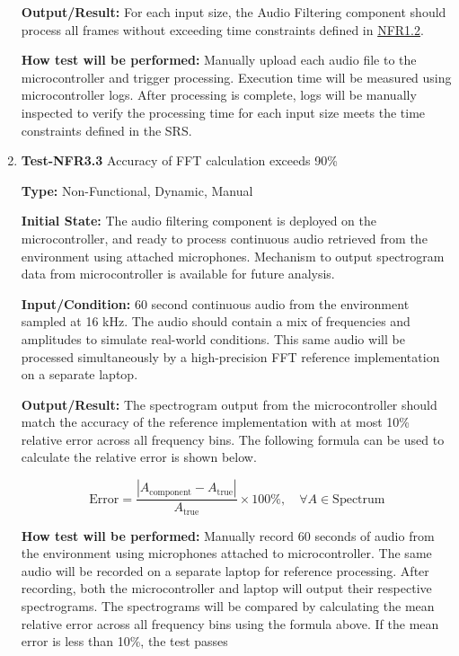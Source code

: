 \documentclass[12pt, titlepage]{article}
\begin{document}
\begin{enumerate}
\textbf{Output/Result:} 
For each input size, the Audio Filtering component should process all frames
without exceeding time constraints defined in \hyperref[SRS-NFR1_2]{NFR1.2}. 
					
\textbf{How test will be performed:} 
Manually upload each audio file to the microcontroller and trigger processing.
Execution time will be measured using microcontroller logs. After processing is
complete, logs will be manually inspected to verify the processing time for each
input size meets the time constraints defined in the SRS.

\item{\textbf{Test-NFR3.3} Accuracy of FFT calculation exceeds 90\%\\}

\textbf{Type:} Non-Functional, Dynamic, Manual
					
\textbf{Initial State:} 
The audio filtering component is deployed on the microcontroller, and ready to
process continuous audio retrieved from the environment using attached
microphones. Mechanism to output spectrogram data from microcontroller is
available for future analysis.
					
\textbf{Input/Condition:} 
60 second continuous audio from the environment sampled at 16 kHz. The audio
should contain a mix of frequencies and amplitudes to simulate real-world
conditions. This same audio will be processed simultaneously by a high-precision
FFT reference implementation on a separate laptop.
					
\textbf{Output/Result:} 
The spectrogram output from the microcontroller should match the accuracy of the
reference implementation with at most 10\% relative error across all frequency
bins. The following formula can be used to calculate the relative error is shown
below. 

\[
\text{Error} = \frac{\left|A_{\text{component}} - 
A_{\text{true}}\right|}{A_{\text{true}}} \times 100\%, 
\quad \forall A \in \text{Spectrum}
\]

\textbf{How test will be performed:} 
Manually record 60 seconds of audio from the environment using microphones
attached to microcontroller. The same audio will be recorded on a separate
laptop for reference processing. After recording, both the microcontroller and
laptop will output their respective spectrograms. The spectrograms will be
compared by calculating the mean relative error across all frequency bins using
the formula above. If the mean error is less than 10\%, the test passes

\end{enumerate}
		
\end{document}
